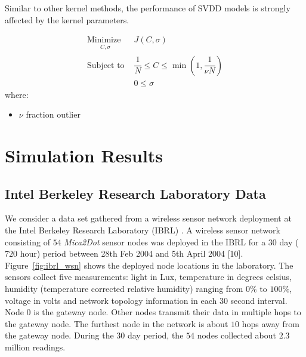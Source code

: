 \documentclass[journal,transmag,times]{IEEEtran}
\begin{document}
Similar to other kernel methods, the performance of SVDD models is strongly affected by the kernel parameters.

\begin{subequations}
\begin{align}
\underset{
	\begin{array}{c}
		 C, \sigma
	\end{array}}{\text{Minimize }} & J\left( C, \sigma \right)\\
\text{Subject to } & \dfrac{1}{N} \le C \le \min \left( 1, \dfrac{1}{\nu N} \right) \\
& 0 \le \sigma
\end{align}
\end{subequations}
where:
\begin{itemize}
\item $\nu$ fraction outlier
\end{itemize}

\section{Simulation Results}

\cite{Suthaharan2010}

\subsection{Intel Berkeley Research Laboratory Data}

We consider a data set gathered from a wireless sensor network deployment at the Intel Berkeley Research Laboratory (IBRL) \cite{Buonadonna2005}. A wireless sensor network consisting of $54$ \emph{Mica2Dot} sensor nodes was deployed in the IBRL for a $30$ day ($720$ hour) period between 28th Feb 2004 and 5th April 2004 [10]. Figure~\ref{fig:ibrl_wsn} shows the deployed node locations in the laboratory. The sensors collect five measurements: light in Lux, temperature in degrees celsius, humidity (temperature corrected relative humidity) ranging from $0\%$ to $100\%$, voltage in volts and network topology information in each $30$ second interval. Node $0$ is the gateway node. Other nodes transmit their data in multiple hops to the gateway node. The furthest node in the network is about $10$ hops away from the gateway node. During the $30$ day period, the $54$ nodes collected about $2.3$ million readings.
\end{document}
